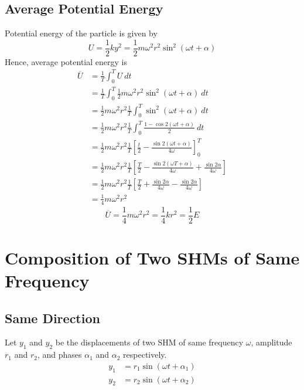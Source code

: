 \documentclass[12pt]{article}
\begin{document}
\subsection{Average Potential Energy}
Potential energy of the particle is given by
\begin{equation}
    U = \frac{1}{2} k y^2 = \frac{1}{2} m \omega^2 r^2 \sin^2{(\omega t + \alpha)}
\end{equation}
Hence, average potential energy is
\begin{align*}
    \overline{U} &= \frac{1}{T} \int_{0}^{T} U \: dt \\
    &= \frac{1}{T} \int_{0}^{T} \frac{1}{2} m \omega^2 r^2 \sin^2{(\omega t + \alpha)} \: dt \\
    &= \frac{1}{2} m \omega^2 r^2 \frac{1}{T} \int_{0}^{T} \sin^2{(\omega t + \alpha)} \: dt \\
    &= \frac{1}{2} m \omega^2 r^2 \frac{1}{T} \int_{0}^{T} \frac{1 - \cos{2(\omega t + \alpha)}}{2} \: dt \\
    &= \frac{1}{2} m \omega^2 r^2 \frac{1}{T} \left[ \frac{t}{2} - \frac{\sin{2(\omega t + \alpha)}}{4\omega} \right]_{0}^{T} \\
    &= \frac{1}{2} m \omega^2 r^2 \frac{1}{T} \left[ \frac{T}{2} - \frac{\sin{2(\omega T + \alpha)}}{4\omega} + \frac{\sin{2\alpha}}{4\omega} \right] \\
    &= \frac{1}{2} m \omega^2 r^2 \frac{1}{T} \left[ \frac{T}{2} + \frac{\sin{2\alpha}}{4\omega} - \frac{\sin{2\alpha}}{4\omega} \right] \\
    &= \frac{1}{4} m \omega^2 r^2
\end{align*}
\begin{equation}
    \boxed{ \overline{U} = \frac{1}{4} m \omega^2 r^2 = \frac{1}{4}k r^2 = \frac{1}{2} E }
\end{equation}

\section{Composition of Two SHMs of Same Frequency}
\subsection{Same Direction}

Let $y_1$ and $y_2$ be the displacements of two SHM of same frequency $\omega$, amplitude $r_1$ and $r_2$, and phases $\alpha_1$ and $\alpha_2$ respectively. \\
\begin{align}
    y_1 &= r_1 \sin{(\omega t + \alpha_1)} \\
    y_2 &= r_2 \sin{(\omega t + \alpha_2)}
\end{align}
\end{document}
